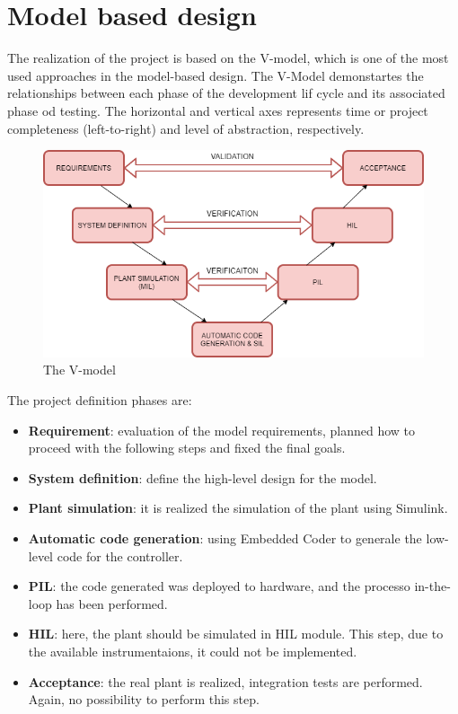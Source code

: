 \documentclass[12pt,a4paper]{report}
\begin{document}
\section{Model based design}
The realization of the project is based on the V-model, which is one of the most used approaches in the model-based design. The V-Model demonstartes the relationships between each phase of the development lif cycle and its associated phase od testing.  The horizontal and vertical axes represents time or project completeness (left-to-right) and level of abstraction, respectively. \\
\begin{figure}[htbp]
	\centering
	\includegraphics[scale=0.6]{v-model.png}
	\caption{The V-model}
\end{figure}
\FloatBarrier
The project definition phases are:
\begin{itemize}
	\item \textbf{Requirement}: evaluation of the model requirements, planned how to proceed with the following steps and fixed the final goals.
	\item \textbf{System definition}: define the high-level design for the model.
	\item \textbf{Plant simulation}: it is realized the simulation of the plant using Simulink.
	\item \textbf{Automatic code generation}: using Embedded Coder to generale the low-level code for the controller.
	\item \textbf{PIL}: the code generated was deployed to hardware, and the processo in-the-loop has been performed.
	\item \textbf{HIL}: here, the plant should be simulated in HIL module. This step, due to the available instrumentaions, it could not be implemented.
	\item \textbf{Acceptance}: the real plant is realized, integration tests are performed. Again, no possibility to perform this step.
\end{itemize}
\FloatBarrier
\end{document}
